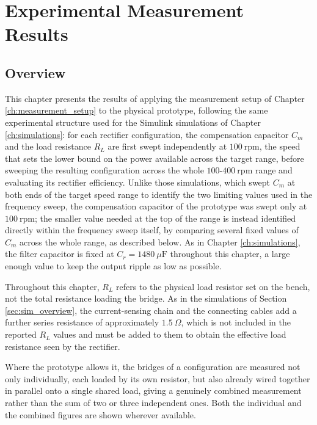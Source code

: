 \chapter{Experimental Measurement Results}
\label{ch:measurements}

\section{Overview}
\label{sec:meas_overview}

This chapter presents the results of applying the measurement setup of Chapter \ref{ch:measurement_setup} to the physical prototype, following the same experimental structure used for the Simulink simulations of Chapter \ref{ch:simulations}: for each rectifier configuration, the compensation capacitor $C_m$ and the load resistance $R_L$ are first swept independently at $100\ \text{rpm}$, the speed that sets the lower bound on the power available across the target range, before sweeping the resulting configuration across the whole $100$-$400\ \text{rpm}$ range and evaluating its rectifier efficiency. Unlike those simulations, which swept $C_m$ at both ends of the target speed range to identify the two limiting values used in the frequency sweep, the compensation capacitor of the prototype was swept only at $100\ \text{rpm}$; the smaller value needed at the top of the range is instead identified directly within the frequency sweep itself, by comparing several fixed values of $C_m$ across the whole range, as described below. As in Chapter \ref{ch:simulations}, the filter capacitor is fixed at $C_r=1480\ \mu\text{F}$ throughout this chapter, a large enough value to keep the output ripple as low as possible.

Throughout this chapter, $R_L$ refers to the physical load resistor set on the bench, not the total resistance loading the bridge. As in the simulations of Section \ref{sec:sim_overview}, the current-sensing chain and the connecting cables add a further series resistance of approximately $1.5\ \Omega$, which is not included in the reported $R_L$ values and must be added to them to obtain the effective load resistance seen by the rectifier.

Where the prototype allows it, the bridges of a configuration are measured not only individually, each loaded by its own resistor, but also already wired together in parallel onto a single shared load, giving a genuinely combined measurement rather than the sum of two or three independent ones. Both the individual and the combined figures are shown wherever available.


